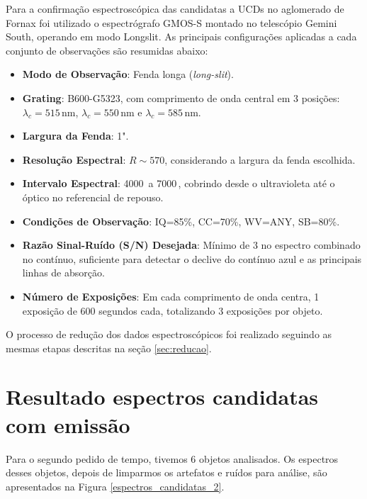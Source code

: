 Para a confirmação espectroscópica das candidatas a UCDs no aglomerado de Fornax foi utilizado o espectrógrafo GMOS-S montado no telescópio Gemini South, operando em modo Longslit. As principais configurações aplicadas a cada conjunto de observações são resumidas abaixo:

\begin{itemize}
    \item \textbf{Modo de Observação}: Fenda longa (\textit{long-slit}).
    \item \textbf{Grating}: B600-G5323, com comprimento de onda central em 3 posições: $\lambda_c = 515 \, \text{nm}$, $\lambda_c = 550 \, \text{nm}$ e $\lambda_c = 585 \, \text{nm}$.
    \item \textbf{Largura da Fenda}: 1".
    \item \textbf{Resolução Espectral}: $R \sim 570$, considerando a largura da fenda escolhida.
    \item \textbf{Intervalo Espectral}: 4000\, a 7000\,, cobrindo desde o ultravioleta até o óptico no referencial de repouso.
    \item \textbf{Condições de Observação}: IQ=85\%, CC=70\%, WV=ANY, SB=80\%.
    \item \textbf{Razão Sinal-Ruído (S/N) Desejada}: Mínimo de 3 no espectro combinado no contínuo, suficiente para detectar o declive do contínuo azul e as principais linhas de absorção.
    \item \textbf{Número de Exposições}: Em cada comprimento de onda centra, 1 exposição de 600 segundos cada, totalizando 3 exposições por objeto.
\end{itemize}


O processo de redução dos dados espectroscópicos foi realizado seguindo as mesmas etapas descritas na seção \ref{sec:reducao}.

\section{Resultado espectros candidatas com emissão}\label{section:resultado_espectros_emissao}

Para o segundo pedido de tempo, tivemos 6 objetos analisados. Os espectros desses objetos, depois de limparmos os artefatos e ruídos para análise, são apresentados na Figura \ref{espectros_candidatas_2}.

